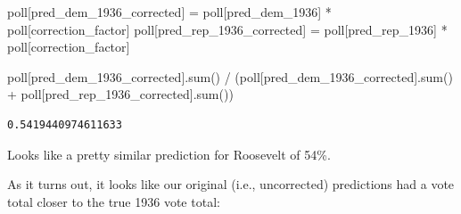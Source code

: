 \documentclass[
  letterpaper,
  DIV=11,
  numbers=noendperiod]{scrreprt}
\newenvironment{Shaded}{\begin{snugshade}}{\end{snugshade}}
\newcommand{\BuiltInTok}[1]{\textcolor[rgb]{0.00,0.23,0.31}{#1}}
\newcommand{\NormalTok}[1]{\textcolor[rgb]{0.00,0.23,0.31}{#1}}
\newcommand{\OperatorTok}[1]{\textcolor[rgb]{0.37,0.37,0.37}{#1}}
\newcommand{\StringTok}[1]{\textcolor[rgb]{0.13,0.47,0.30}{#1}}
\begin{document}
\begin{Shaded}
\begin{Highlighting}[]
\NormalTok{poll[}\StringTok{\textquotesingle{}pred\_dem\_1936\_corrected\textquotesingle{}}\NormalTok{] }\OperatorTok{=}\NormalTok{ poll[}\StringTok{\textquotesingle{}pred\_dem\_1936\textquotesingle{}}\NormalTok{] }\OperatorTok{*}\NormalTok{ poll[}\StringTok{\textquotesingle{}correction\_factor\textquotesingle{}}\NormalTok{]}
\NormalTok{poll[}\StringTok{\textquotesingle{}pred\_rep\_1936\_corrected\textquotesingle{}}\NormalTok{] }\OperatorTok{=}\NormalTok{ poll[}\StringTok{\textquotesingle{}pred\_rep\_1936\textquotesingle{}}\NormalTok{] }\OperatorTok{*}\NormalTok{ poll[}\StringTok{\textquotesingle{}correction\_factor\textquotesingle{}}\NormalTok{]}

\NormalTok{poll[}\StringTok{\textquotesingle{}pred\_dem\_1936\_corrected\textquotesingle{}}\NormalTok{].}\BuiltInTok{sum}\NormalTok{() }\OperatorTok{/}\NormalTok{ (poll[}\StringTok{\textquotesingle{}pred\_dem\_1936\_corrected\textquotesingle{}}\NormalTok{].}\BuiltInTok{sum}\NormalTok{() }\OperatorTok{+}\NormalTok{ poll[}\StringTok{\textquotesingle{}pred\_rep\_1936\_corrected\textquotesingle{}}\NormalTok{].}\BuiltInTok{sum}\NormalTok{())}
\end{Highlighting}
\end{Shaded}

\begin{verbatim}
0.5419440974611633
\end{verbatim}

Looks like a pretty similar prediction for Roosevelt of 54\%.

As it turns out, it looks like our original (i.e., uncorrected)
predictions had a vote total closer to the true 1936 vote total:
\end{document}
